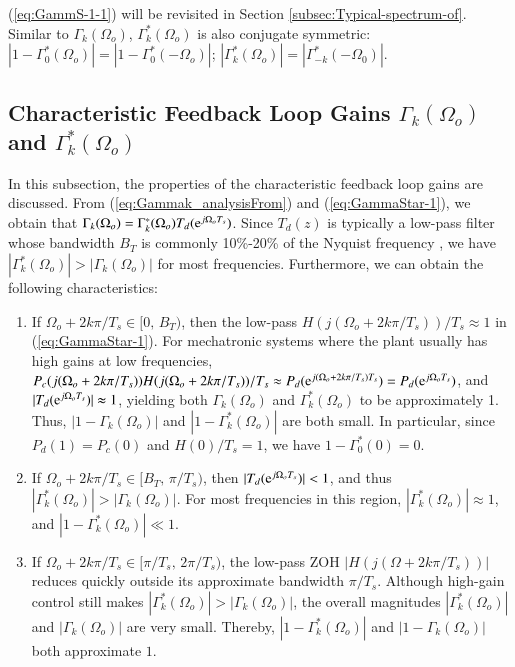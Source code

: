 \documentclass [11pt, proquest] {uwthesis}[2020/02/24]
\begin{document}
(\ref{eq:GammS-1-1}) will be revisited in Section \ref{subsec:Typical-spectrum-of}.
Similar to $\Gamma_{k}(\Omega_{o})$, $\Gamma_{k}^{*}(\Omega_{o})$
is also conjugate symmetric: $\left|1-\Gamma_{0}^{*}(\Omega_{o})\right|=\left|1-\Gamma_{0}^{*}(-\Omega_{o})\right|$;
$\left|\Gamma_{k}^{*}(\Omega_{o})\right|=\left|\Gamma_{-k}^{*}(-\Omega_{0})\right|$.

\subsection{\label{subsec:Characteristic-feedback-loop}Characteristic Feedback
Loop Gains $\Gamma_{k}(\Omega_{o})$ and $\Gamma_{k}^{*}(\Omega_{o})$}

In this subsection, the properties of the characteristic feedback
loop gains are discussed. From (\ref{eq:Gammak_analysisFrom}) and
(\ref{eq:GammaStar-1}), we obtain that $\Gamma_{k}(\Omega_{o})=\Gamma_{k}^{*}(\Omega_{o})T_{d}(\mathrm{e}^{j\Omega_{o}T_{s}})$.
Since $T_{d}(z)$ is typically a low-pass filter whose bandwidth $B_{T}$
is commonly 10\%-20\% of the Nyquist frequency \cite{astrom_computer-controlled_1996},
we have $|\Gamma_{k}^{*}(\Omega_{o})|>|\Gamma_{k}(\Omega_{o})|$ for
most frequencies. Furthermore, we can obtain the following characteristics:
\begin{enumerate}
\item If \uline{\mbox{$\Omega_{o}+2k\pi/T_{s}\in[0,\,B_{T})$}}, then
the low-pass $H(j(\Omega_{o}+2k\pi/T_{s}))/T_{s}\approx1$ in (\ref{eq:GammaStar-1}).
For mechatronic systems where the plant usually has high gains at
low frequencies, $P_{c}(j(\Omega_{o}+2k\pi/T_{s}))H(j(\Omega_{o}+2k\pi/T_{s}))/T_{s}\approx P_{d}(\mathrm{e}^{j(\Omega_{o}+2k\pi/T_{s})T_{s}})=P_{d}(\mathrm{e}^{j\Omega_{o}T_{s}})$,
and $|T_{d}(\mathrm{e}^{j\Omega_{o}T_{s}})|\thickapprox1$, yielding both
$\Gamma_{k}(\Omega_{o})$ and $\Gamma_{k}^{*}(\Omega_{o})$ to be
approximately 1. Thus, $|1-\Gamma_{k}(\Omega_{o})|$ and $|1-\Gamma_{k}^{*}(\Omega_{o})|$
are both small. In particular, since $P_{d}(1)=P_{c}(0)$ \cite{Astrom1984_zerosOfSampledSys}
and $H(0)/T_{s}=1$, we have $1-\Gamma_{0}^{*}(0)=0$.
\item If \uline{\mbox{$\Omega_{o}+2k\pi/T_{s}\in[B_{T},\,\pi/T_{s})$}},
then $|T_{d}(\mathrm{e}^{j\Omega_{o}T_{s}})|<1$, and thus $|\Gamma_{k}^{*}(\Omega_{o})|>|\Gamma_{k}(\Omega_{o})|$.
For most frequencies in this region, $|\Gamma_{k}^{*}(\Omega_{o})|\approx1$,
and $|1-\Gamma_{k}^{*}(\Omega_{o})|\ll1$. 
\item If \uline{\mbox{$\Omega_{o}+2k\pi/T_{s}\in[\pi/T_{s},\,2\pi/T_{s})$}},
the low-pass ZOH $|H(j(\Omega+2k\pi/T_{s}))|$ reduces quickly outside
its approximate bandwidth $\pi/T_{s}$. Although high-gain control
still makes $|\Gamma_{k}^{*}(\Omega_{o})|>|\Gamma_{k}(\Omega_{o})|$,
the overall magnitudes $|\Gamma_{k}^{*}(\Omega_{o})|$ and $\left|\Gamma_{k}(\Omega_{o})\right|$
are very small. Thereby, $\left|1-\Gamma_{k}^{*}(\Omega_{o})\right|$
and $\left|1-\Gamma_{k}(\Omega_{o})\right|$ both approximate $1$. 
\end{enumerate}
\end{document}
